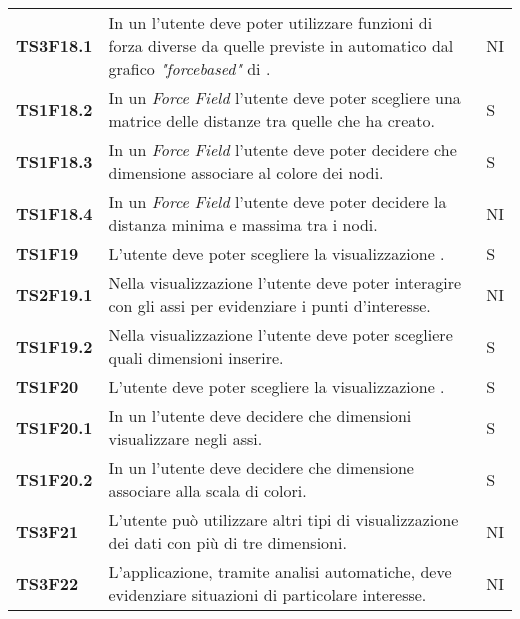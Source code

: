 {\begin{longtable}{ C{2cm} | C{12cm}| C{1.5cm} }
\textbf{TS3F18.1} & 
In un  l'utente deve poter utilizzare funzioni di forza diverse da quelle previste in automatico dal grafico \textit{"forcebased"} di . & 
NI\\

\textbf{TS1F18.2} & 
In un \textit{Force Field} l'utente deve poter scegliere una matrice delle distanze tra quelle che ha creato. & 
S\\

\textbf{TS1F18.3} & 
In un \textit{Force Field} l'utente deve poter decidere che dimensione
associare al colore dei nodi. & 
S\\

\textbf{TS1F18.4} & 
In un \textit{Force Field} l'utente deve poter decidere la distanza minima e
massima tra i nodi. & 
NI\\

\textbf{TS1F19} & 
L'utente deve poter scegliere la visualizzazione . & 
S\\

\textbf{TS2F19.1} & 
Nella visualizzazione  l'utente deve poter interagire con gli assi per evidenziare i punti d'interesse. & 
NI\\

\textbf{TS1F19.2} & 
Nella visualizzazione  l'utente deve poter scegliere quali dimensioni inserire. & 
S\\

\textbf{TS1F20} & 
L'utente deve poter scegliere la visualizzazione . & 
S\\

\textbf{TS1F20.1} & 
In un  l'utente deve decidere che dimensioni
visualizzare negli assi. & 
S\\

\textbf{TS1F20.2} & 
In un  l'utente deve decidere che dimensione
associare alla scala di colori. & 
S\\

\textbf{TS3F21} & 
L'utente può utilizzare altri tipi di visualizzazione dei dati con più di tre dimensioni. & 
NI\\

\textbf{TS3F22} & 
L'applicazione, tramite analisi automatiche, deve evidenziare situazioni di particolare interesse. & 
NI\\


\end{longtable}}
